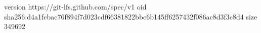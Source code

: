 version https://git-lfs.github.com/spec/v1
oid sha256:d4a1fcbac76f894f7d023cdf66381822bbc6b145ff6257432f086ac8d3f3c8d4
size 349692
